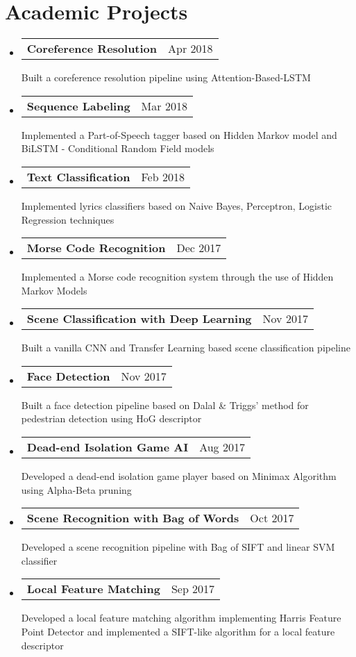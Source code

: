 \documentclass[letterpaper,10pt]{article}
\makeatletter
\newcommand{\resumeSubItem}[3]{
  \vspace{-1pt}\item[]
    \begin{tabular*}{0.97\textwidth}{l@{\extracolsep{\fill}}r}
      \textbf{\small#1} & {\small#2} \\
    \end{tabular*}
    {\small#3} \\
}
\newcommand{\resumeSubHeadingListStart}{\begin{itemize}[label={}, leftmargin=*]}
\newcommand{\resumeSubHeadingListEnd}{\end{itemize}}
\makeatother
\begin{document}
\section{Academic Projects}
  \resumeSubHeadingListStart  	
	\resumeSubItem{Coreference Resolution}{Apr 2018}{Built a coreference resolution pipeline using Attention-Based-LSTM}
	\resumeSubItem{Sequence Labeling}{Mar 2018}{Implemented a Part-of-Speech tagger based on Hidden Markov model and BiLSTM - Conditional Random Field models}
	\resumeSubItem{Text Classification}{Feb 2018}{Implemented lyrics classifiers based on Naive Bayes, Perceptron, Logistic Regression techniques}
    \resumeSubItem{Morse Code Recognition}{Dec 2017} {Implemented a Morse code recognition system through the use of Hidden Markov Models}
    \resumeSubItem{Scene Classification with Deep Learning}{Nov 2017}{Built a vanilla CNN and Transfer Learning based scene classification pipeline}
    \resumeSubItem{Face Detection}{Nov 2017} {Built a face detection pipeline based on Dalal \& Triggs’ method for pedestrian detection using HoG descriptor}
    \resumeSubItem{Dead-end Isolation Game AI}{Aug 2017} {Developed a dead-end isolation game player based on Minimax Algorithm using Alpha-Beta pruning}
    \resumeSubItem{Scene Recognition with Bag of Words}{Oct 2017} {Developed a scene recognition pipeline with Bag of SIFT and linear SVM classifier}
    \resumeSubItem{Local Feature Matching}{Sep 2017} {Developed a local feature matching algorithm implementing Harris Feature Point Detector and implemented a SIFT-like algorithm for a local feature descriptor}
  \resumeSubHeadingListEnd

\end{document}
